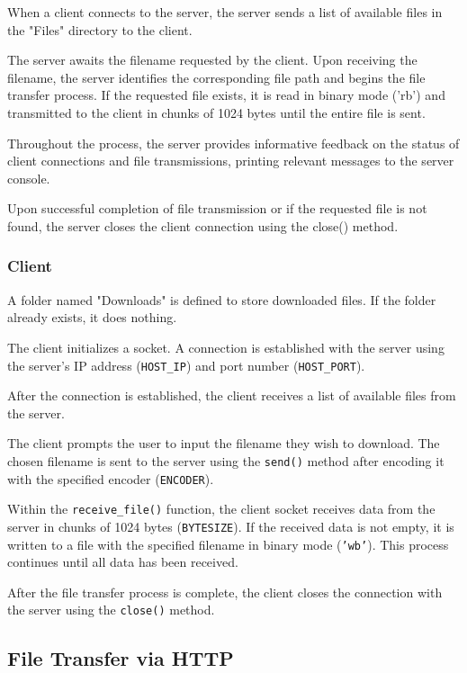 \documentclass[11pt]{article}
\begin{document}
When a client connects to the server, the server sends a list of available files in the "Files" directory to the client.

The server awaits the filename requested by the client. Upon receiving the filename, the server identifies the corresponding file path and begins the file transfer process. If the requested file exists, it is read in binary mode ('rb') and transmitted to the client in chunks of 1024 bytes until the entire file is sent.

Throughout the process, the server provides informative feedback on the status of client connections and file transmissions, printing relevant messages to the server console.

Upon successful completion of file transmission or if the requested file is not found, the server closes the client connection using the close() method.
\subsubsection{Client}

A folder named "Downloads" is defined to store downloaded files. If the folder already exists, it does nothing.

The client initializes a socket. A connection is established with the server using the server's IP address (\texttt{HOST\_IP}) and port number (\texttt{HOST\_PORT}).

After the connection is established, the client receives a list of available files from the server.

The client prompts the user to input the filename they wish to download. The chosen filename is sent to the server using the \texttt{send()} method after encoding it with the specified encoder (\texttt{ENCODER}).

Within the \texttt{receive\_file()} function, the client socket receives data from the server in chunks of 1024 bytes (\texttt{BYTESIZE}). If the received data is not empty, it is written to a file with the specified filename in binary mode (\texttt{'wb'}). This process continues until all data has been received.

After the file transfer process is complete, the client closes the connection with the server using the \texttt{close()} method.


\subsection{File Transfer via HTTP}
\end{document}
